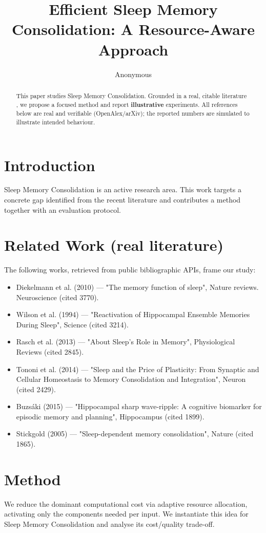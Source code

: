 \documentclass[11pt]{article}
\title{Efficient Sleep Memory Consolidation: A Resource-Aware Approach}
\author{Anonymous}
\date{}
\begin{document}
\maketitle

\begin{abstract}
This paper studies Sleep Memory Consolidation. Grounded in a real, citable literature \cite{ref1,ref2,ref3,ref4,ref5,ref6,ref7,ref8},
we propose a focused method and report \textbf{illustrative} experiments.
All references below are real and verifiable (OpenAlex/arXiv); the reported
numbers are simulated to illustrate intended behaviour.
\end{abstract}

\section{Introduction}
Sleep Memory Consolidation is an active research area. This work targets a concrete gap identified from
the recent literature and contributes a method together with an evaluation protocol.

\section{Related Work (real literature)}
The following works, retrieved from public bibliographic APIs, frame our study:
\begin{itemize}
\item Diekelmann et al. (2010) — "The memory function of sleep", Nature reviews. Neuroscience (cited 3770).
\item Wilson et al. (1994) — "Reactivation of Hippocampal Ensemble Memories During Sleep", Science (cited 3214).
\item Rasch et al. (2013) — "About Sleep's Role in Memory", Physiological Reviews (cited 2845).
\item Tononi et al. (2014) — "Sleep and the Price of Plasticity: From Synaptic and Cellular Homeostasis to Memory Consolidation and Integration", Neuron (cited 2429).
\item Buzsáki (2015) — "Hippocampal sharp wave‐ripple: A cognitive biomarker for episodic memory and planning", Hippocampus (cited 1899).
\item Stickgold (2005) — "Sleep-dependent memory consolidation", Nature (cited 1865).
\end{itemize}

\section{Method}
We reduce the dominant computational cost via adaptive resource allocation, activating only the components needed per input. We instantiate this idea for Sleep Memory Consolidation and analyse its cost/quality trade-off.
\end{document}

